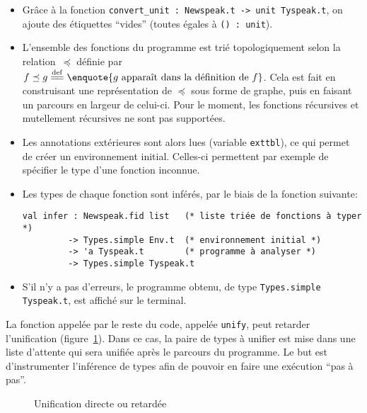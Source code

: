 \begin{itemize}

\item Grâce à la fonction \verb!convert_unit : Newspeak.t -> unit Tyspeak.t!, on
ajoute des étiquettes \enquote{vides} (toutes égales à \verb!() : unit!).

\item L'ensemble des fonctions du programme est trié topologiquement selon la
    relation~$\preceq$ définie par $f \preceq g \eqdef \enquote{g \textrm{
    apparaît dans la définition de } f}$. Cela est fait en construisant une
    représentation de $\preceq$ sous forme de graphe, puis en faisant un
    parcours en largeur de celui-ci. Pour le moment, les fonctions récursives et
    mutellement récursives ne sont pas supportées.

\item Les annotations extérieures sont alors lues (variable \texttt{exttbl}), ce
  qui permet de créer un environnement initial. Celles-ci permettent par exemple
  de spécifier le type d'une fonction inconnue.

\item Les types de chaque fonction sont inférés, par le biais de la fonction
  suivante:

\begin{Verbatim}
val infer : Newspeak.fid list   (* liste triée de fonctions à typer *)
         -> Types.simple Env.t  (* environnement initial *)
         -> 'a Tyspeak.t        (* programme à analyser *)
         -> Types.simple Tyspeak.t
\end{Verbatim}

\item S'il n'y a pas d'erreurs, le programme obtenu, de type
\texttt{Types.simple Tyspeak.t}, est affiché sur le terminal.

\end{itemize}

La fonction appelée par le reste du code, appelée \texttt{unify}, peut
retarder l'unification (figure~\ref{fig:implem-lazy}). Dans ce cas, la paire de
types à unifier est mise dans une liste d'attente qui sera unifiée après le
parcours du programme. Le but est d'instrumenter l'inférence de types afin de
pouvoir en faire une exécution \enquote{pas à pas}.


\begin{figure}


\caption{Unification directe ou retardée}
\label{fig:implem-lazy}
\end{figure}

